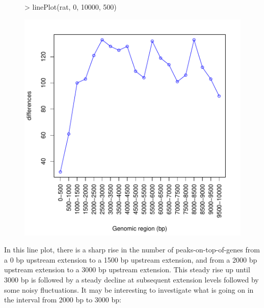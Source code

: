 \documentclass[12pt]{article}
\begin{document}
\begin{figure}[H]
\begin{center}
\begin{Schunk}
\begin{Sinput}
> linePlot(rat, 0, 10000, 500)
\end{Sinput}
\end{Schunk}
\includegraphics{geneXtendeR-016}
\end{center}
\end{figure}

In this line plot, there is a sharp rise in the number of peaks-on-top-of-genes from a 0 bp upstream extension to a 1500 bp upstream extension, and from a 2000 bp upstream extension to a 3000 bp upstream extension.  This steady rise up until 3000 bp is followed by a steady decline at subsequent extension levels followed by some noisy fluctuations.  It may be interesting to investigate what is going on in the interval from 2000 bp to 3000 bp: 
\end{document}
